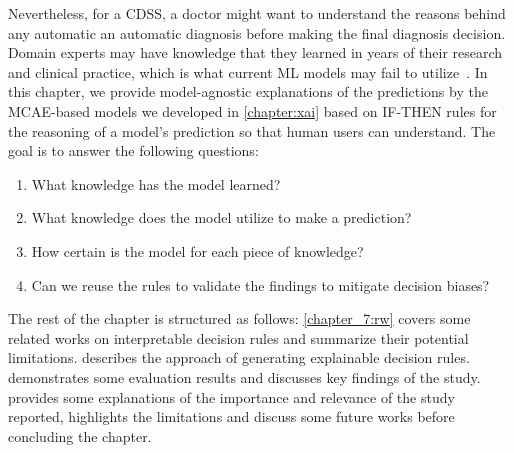 \hspace*{3.5mm} Nevertheless, for a CDSS, a doctor might want to understand the reasons behind any automatic an automatic diagnosis before making the final diagnosis decision. Domain experts may have knowledge that they learned in years of their research and clinical practice, which is what current ML models may fail to utilize~\cite{ming2018rulematrix}. 
In this chapter, we provide model-agnostic explanations of the predictions by the MCAE-based models we developed in \cref{chapter:xai} based on IF-THEN rules for the reasoning of a model's prediction so that human users can understand. The goal is to answer the following questions: 

\begin{enumerate}[noitemsep]
    \item What knowledge has the model learned?
    \item What knowledge does the model utilize to make a prediction?
    \item How certain is the model for each piece of knowledge? 
    \item Can we reuse the rules to validate the findings to mitigate decision biases? 
\end{enumerate}

\hspace*{3.5mm} The rest of the chapter is structured as follows: \cref{chapter_7:rw} covers some related works on interpretable decision rules and summarize their potential limitations.  describes the approach of generating explainable decision rules.  demonstrates some evaluation results and discusses key findings of the study.   provides some explanations of the importance and relevance of the study reported, highlights the limitations and discuss some future works before concluding the chapter.  

